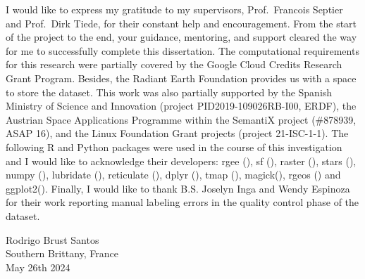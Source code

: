 

\begin{acknowledgements}
 	I would like to express my gratitude to my supervisors, Prof.~Francois Septier
 and Prof.~Dirk Tiede, for their constant help and encouragement. From the start
 of the project to the end, your guidance, mentoring, and support cleared the way
 for me to successfully complete this dissertation. The computational requirements
 for this research were partially covered by the Google Cloud Credits Research Grant Program. Besides,
 the Radiant Earth Foundation provides us with a space to store the dataset. This work
 was also partially supported by the Spanish Ministry of Science and Innovation
 (project PID2019-109026RB-I00, ERDF), the Austrian Space Applications Programme
 within the SemantiX project (\#878939, ASAP 16), and the Linux Foundation Grant
 projects (project 21-ISC-1-1). The following R and Python packages
 were used in the course of this investigation and I would like to acknowledge
 their developers: rgee (\cite{Aybar2020}), sf (\cite{Pebesma2018}),
 raster (\cite{hijmans2015package}), stars (\cite{pebesma2020stars}),
 numpy (\cite{harris2020array}), lubridate (\cite{grolemund2011dates}),
 reticulate (\cite{ushey2020reticulate}), dplyr (\cite{wickham2014dplyr}),
 tmap (\cite{tennekes2018tmap}), magick(\cite{ooms2020magick}),
 rgeos (\cite{bivand2017package}) and ggplot2(\cite{wickham2011ggplot2}). Finally,
 I would like to thank B.S. Joselyn Inga and Wendy Espinoza for their work
 reporting manual labeling errors in the quality control phase of the dataset.

 \begin{flushright}
 Rodrigo Brust Santos \\
 Southern Brittany, France \\
 May 26th 2024
 \end{flushright}
\end{acknowledgements}
